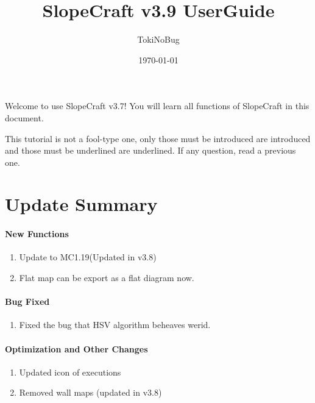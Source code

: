 \documentclass{article}
\title{SlopeCraft v3.9 UserGuide}
\author{TokiNoBug}
\date{\today}
\begin{document}
\maketitle
Welcome to use SlopeCraft v3.7! You will learn all functions of SlopeCraft in this document.

This tutorial is not a fool-type one, only those must be introduced are introduced and those must be underlined are underlined. If any question, read a previous one.

\section{Update Summary}

\paragraph{New Functions}
\begin{enumerate}
    \item Update to MC1.19(Updated in v3.8)
    \item Flat map can be export as a flat diagram now.
\end{enumerate}

\paragraph{Bug Fixed}
\begin{enumerate}
    \item Fixed the bug that HSV algorithm beheaves werid.
\end{enumerate}

\paragraph{Optimization and Other Changes}
\begin{enumerate}
    \item Updated icon of executions
    \item Removed wall maps (updated in v3.8)
\end{enumerate}
\end{document}
